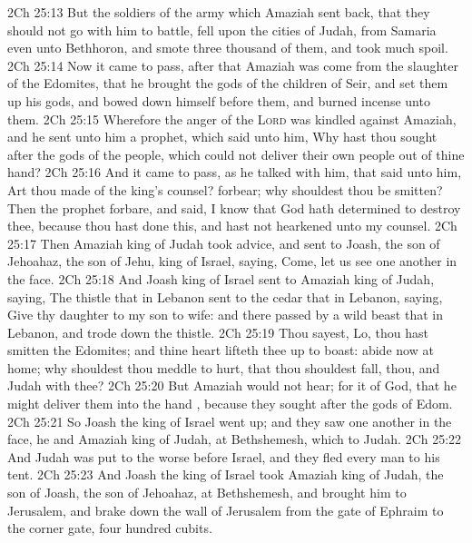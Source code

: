 \vs 2Ch 25:13 But the soldiers of the army which Amaziah sent back, that they should not go with him to battle, fell upon the cities of Judah, from Samaria even unto Bethhoron, and smote three thousand of them, and took much spoil.
\vs 2Ch 25:14 Now it came to pass, after that Amaziah was come from the slaughter of the Edomites, that he brought the gods of the children of Seir, and set them up  his gods, and bowed down himself before them, and burned incense unto them.
\vs 2Ch 25:15 Wherefore the anger of the \textsc{Lord} was kindled against Amaziah, and he sent unto him a prophet, which said unto him, Why hast thou sought after the gods of the people, which could not deliver their own people out of thine hand?
\vs 2Ch 25:16 And it came to pass, as he talked with him, that  said unto him, Art thou made of the king's counsel? forbear; why shouldest thou be smitten? Then the prophet forbare, and said, I know that God hath determined to destroy thee, because thou hast done this, and hast not hearkened unto my counsel.
\vs 2Ch 25:17 Then Amaziah king of Judah took advice, and sent to Joash, the son of Jehoahaz, the son of Jehu, king of Israel, saying, Come, let us see one another in the face.
\vs 2Ch 25:18 And Joash king of Israel sent to Amaziah king of Judah, saying, The thistle that  in Lebanon sent to the cedar that  in Lebanon, saying, Give thy daughter to my son to wife: and there passed by a wild beast that  in Lebanon, and trode down the thistle.
\vs 2Ch 25:19 Thou sayest, Lo, thou hast smitten the Edomites; and thine heart lifteth thee up to boast: abide now at home; why shouldest thou meddle to  hurt, that thou shouldest fall,  thou, and Judah with thee?
\vs 2Ch 25:20 But Amaziah would not hear; for it  of God, that he might deliver them into the hand , because they sought after the gods of Edom.
\vs 2Ch 25:21 So Joash the king of Israel went up; and they saw one another in the face,  he and Amaziah king of Judah, at Bethshemesh, which  to Judah.
\vs 2Ch 25:22 And Judah was put to the worse before Israel, and they fled every man to his tent.
\vs 2Ch 25:23 And Joash the king of Israel took Amaziah king of Judah, the son of Joash, the son of Jehoahaz, at Bethshemesh, and brought him to Jerusalem, and brake down the wall of Jerusalem from the gate of Ephraim to the corner gate, four hundred cubits.
